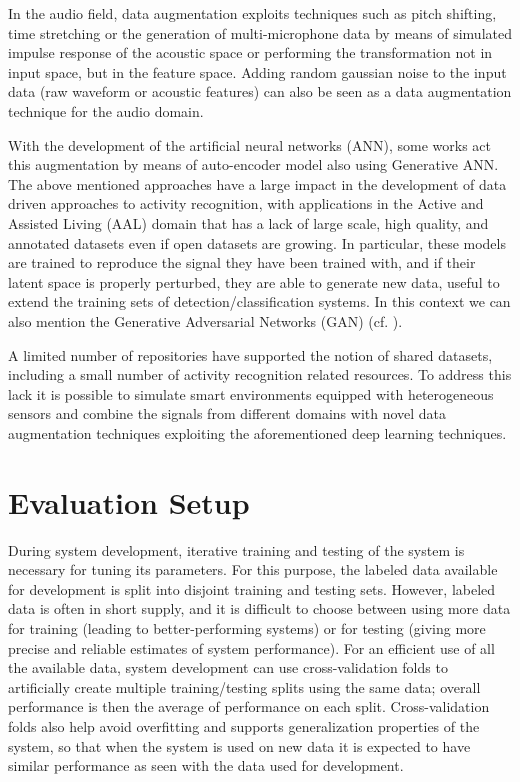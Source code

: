 In the audio field, data augmentation exploits techniques such as pitch shifting, time stretching or the generation of multi-microphone data by means of simulated impulse response of the acoustic space or performing the transformation not in input space, but in the feature space. Adding random gaussian noise to the input data (raw waveform or acoustic features) can also be seen as a data augmentation technique for the audio domain.

With the development of the artificial neural networks (ANN), some works act this augmentation by means of auto-encoder model also using Generative ANN. The above mentioned approaches have a large impact in the development of data driven approaches to activity recognition, with applications in the Active and Assisted Living (AAL) domain that has a lack of large scale, high quality, and annotated datasets even if open datasets are growing. In particular, these models are trained to reproduce the signal they have been trained with, and if their latent space is properly perturbed, they are able to generate new data, useful to extend the training sets of detection/classification systems. In this context we can also mention the Generative Adversarial Networks (GAN) (cf. ). 

A limited number of repositories have supported the notion of shared datasets, including a small number of activity recognition related resources. To address this lack it is possible to simulate smart environments equipped with heterogeneous sensors and combine the signals from different domains with novel data augmentation techniques exploiting the aforementioned deep learning techniques.

\newpage
\section{Evaluation Setup}
During system development, iterative training and testing of the system is necessary
for tuning its parameters. For this purpose, the labeled data available for development is split into disjoint training and testing sets. However, labeled data is often in short supply, and it is difficult to choose between using more data for training (leading to better-performing systems) or for testing (giving more precise and
reliable estimates of system performance). For an efficient use of all the available
data, system development can use cross-validation folds to artificially
create multiple training/testing splits using the same data; overall performance is
then the average of performance on each split. Cross-validation folds also help avoid
overfitting and supports generalization properties of the system, so that when the
system is used on new data it is expected to have similar performance as seen with
the data used for development.

